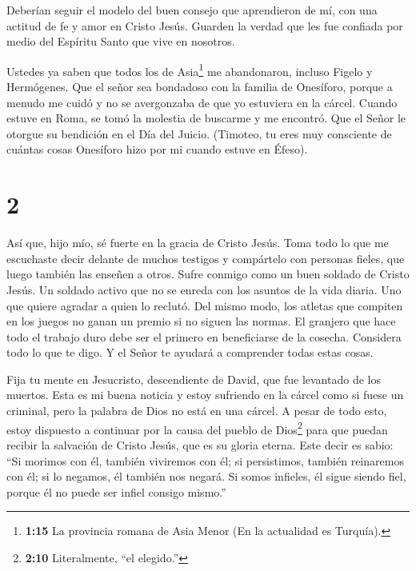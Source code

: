  Deberían seguir el modelo del buen consejo que aprendieron
de mí, con una actitud de fe y amor en Cristo Jesús. 
Guarden la verdad que les fue confiada por medio del Espíritu Santo que
vive en nosotros.

 Ustedes ya saben que todos los de Asia\footnote{\textbf{1:15}
  La provincia romana de Asia Menor (En la actualidad es Turquía).} me
abandonaron, incluso Figelo y Hermógenes.  Que el señor sea
bondadoso con la familia de Onesíforo, porque a menudo me cuidó y no se
avergonzaba de que yo estuviera en la cárcel.  Cuando
estuve en Roma, se tomó la molestia de buscarme y me encontró.
 Que el Señor le otorgue su bendición en el Día del Juicio.
(Timoteo, tu eres muy consciente de cuántas cosas Onesíforo hizo por mi
cuando estuve en Éfeso).

\hypertarget{section-1}{%
\section{2}\label{section-1}}

 Así que, hijo mío, sé fuerte en la gracia de Cristo Jesús.
 Toma todo lo que me escuchaste decir delante de muchos
testigos y compártelo con personas fieles, que luego también las enseñen
a otros.  Sufre conmigo como un buen soldado de Cristo
Jesús.  Un soldado activo que no se enreda con los asuntos
de la vida diaria. Uno que quiere agradar a quien lo reclutó.
 Del mismo modo, los atletas que compiten en los juegos no
ganan un premio si no siguen las normas.  El granjero que
hace todo el trabajo duro debe ser el primero en beneficiarse de la
cosecha.  Considera todo lo que te digo. Y el Señor te
ayudará a comprender todas estas cosas.

 Fija tu mente en Jesucristo, descendiente de David, que fue
levantado de los muertos. Esta es mi buena noticia  y estoy
sufriendo en la cárcel como si fuese un criminal, pero la palabra de
Dios no está en una cárcel.  A pesar de todo esto, estoy
dispuesto a continuar por la causa del pueblo de Dios\footnote{\textbf{2:10}
  Literalmente, ``el elegido.''} para que puedan recibir la salvación de
Cristo Jesús, que es su gloria eterna.  Este decir es
sabio: ``Si morimos con él, también viviremos con él;  si
persistimos, también reinaremos con él; si lo negamos, él también nos
negará.  Si somos infieles, él sigue siendo fiel, porque él
no puede ser infiel consigo mismo.''

